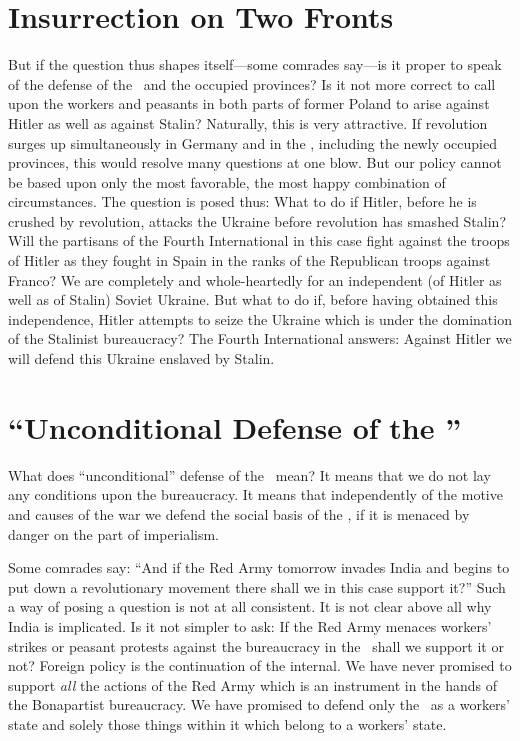 \section*{Insurrection on Two Fronts}

But if the question thus shapes itself---some comrades say---is it proper to speak of the defense of the \USSR\ and the occupied provinces? Is it not more correct to call upon the workers and peasants in both parts of former Poland to arise against Hitler as well as against Stalin? Naturally, this is very attractive. If revolution surges up simultaneously in Germany and in the \USSR, including the newly occupied provinces, this would resolve many questions at one blow. But our policy cannot be based upon only the most favorable, the most happy combination of circumstances. The question is posed thus: What to do if Hitler, before he is crushed by revolution, attacks the Ukraine before revolution has smashed Stalin? Will the partisans of the Fourth International in this case fight against the troops of Hitler as they fought in Spain in the ranks of the Republican troops against Franco? We are completely and whole-heartedly for an independent (of Hitler as well as of Stalin) Soviet Ukraine. But what to do if, before having obtained this independence, Hitler attempts to seize the Ukraine which is under the domination of the Stalinist bureaucracy? The Fourth International answers: Against Hitler we will defend this Ukraine enslaved by Stalin.
\nowidow

\section*{“Unconditional Defense of the \USSR”}

What does “unconditional” defense of the \USSR\ mean? It means that we do not lay any conditions upon the bureaucracy. It means that independently of the motive and causes of the war we defend the social basis of the \USSR, if it is menaced by danger on the part of imperialism.

Some comrades say: “And if the Red Army tomorrow invades India and begins to put down a revolutionary movement there shall we in this case support it?” Such a way of posing a question is not at all consistent. It is not clear above all why India is implicated. Is it not simpler to ask: If the Red Army menaces workers’ strikes or peasant protests against the bureaucracy in the \USSR\ shall we support it or not? Foreign policy is the continuation of the internal. We have never promised to support \emph{all} the actions of the Red Army which is an instrument in the hands of the Bonapartist bureaucracy. We have promised to defend only the \USSR\ as a workers’ state and solely those things within it which belong to a workers’ state.

